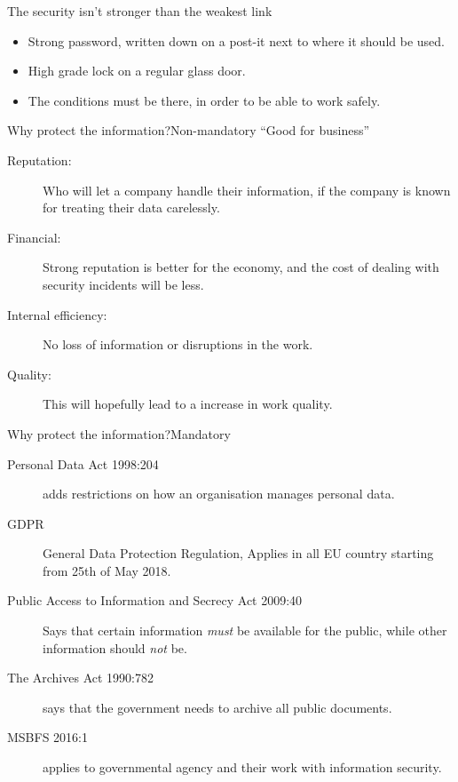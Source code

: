 \documentclass{beamer}
\begin{document}
\begin{frame}{The security isn't stronger than the weakest link}
  \begin{itemize}
    \item Strong password, written down on a post-it next to where it should be
      used.
    \item High grade lock on a regular glass door.
    \item The conditions must be there, in order to be able to work safely.
  \end{itemize}
\end{frame}

\begin{frame}{Why protect the information?}{Non-mandatory}
  \enquote{Good for business}
  \begin{description}
    \item[Reputation:] Who will let a company handle their information, if the
      company is known for treating their data carelessly.

    \item[Financial:] Strong reputation is better for the economy, and the cost
      of dealing with security incidents will be less.

    \item[Internal efficiency:] No loss of information or disruptions in the
      work.

    \item[Quality:] This will hopefully lead to a increase in work quality.

  \end{description}
\end{frame}

\begin{frame}{Why protect the information?}{Mandatory}
  \begin{description}
    \item[Personal Data Act 1998:204] adds restrictions on how an organisation manages
      personal data.

    \item[GDPR] General Data Protection Regulation, Applies in all EU country
      starting from 25th of May 2018.
    \item[Public Access to Information and Secrecy Act 2009:40] Says that certain
      information \emph{must} be available for the public, while other information
      should \emph{not} be.

    \item[The Archives Act 1990:782] says that the government needs to archive
      all public documents.

    \item[MSBFS 2016:1] applies to governmental agency and their
      work with information security.

  \end{description}
\end{frame}
\end{document}

